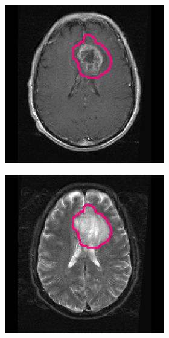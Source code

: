 \begin{subappendices}
\begin{figure}[htbp]
\begin{subfigure}[b]{0.95\textwidth}
\begin{subfigure}[b]{0.215\textwidth}
        \includegraphics[width=\textwidth, clip, trim=2.5cm 0.5cm 2.5cm 0.5cm]{Figures/Random_segs/T1GD_TCGA-12-1094.png}
        \end{subfigure}
        \hfill
        \begin{subfigure}[b]{0.215\textwidth}
        \includegraphics[width=\textwidth, clip, trim=2.5cm 0.5cm 2.5cm 0.5cm]{Figures/Random_segs/T2_TCGA-12-1094.png}

\end{subfigure}
\end{subfigure}
\end{figure}
\end{subappendices}
